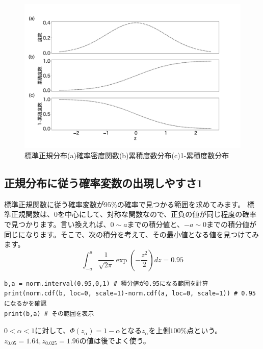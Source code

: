 \begin{figure}
    \begin{center}
        \includegraphics[width=15cm]{./image/02_/standard_normal.pdf}
        \caption{標準正規分布(a)確率密度関数(b)累積度数分布(c)1-累積度数分布}
        \label{fig:standard_normal_distribution}

    \end{center}
\end{figure}
    

\subsection{正規分布に従う確率変数の出現しやすさ1}
標準正規関数に従う確率変数が$95\%$の確率で見つかる範囲を求めてみます。
標準正規関数は、0を中心にして、対称な関数なので、正負の値が同じ程度の確率で見つかります。言い換えれば、$0\sim a$までの積分値と、$-a\sim 0$までの積分値が同じになります。そこで、次の積分を考えて、その最小値となる値を見つけてみます。
\begin{equation}
\int_{-a}^{a} \frac{1}{\sqrt{2\pi}}\exp(-\frac{z^2}{2}) dz = 0.95
\end{equation}

\begin{lstlisting}
b,a = norm.interval(0.95,0,1) # 積分値が0.95になる範囲を計算
print(norm.cdf(b, loc=0, scale=1)-norm.cdf(a, loc=0, scale=1)) # 0.95になるかを確認
print(b,a) # その範囲を表示
\end{lstlisting}


$0<\alpha<1$に対して、$\Phi(z_\alpha) = 1-\alpha$となる$z_\alpha$を上側$100\%$点という。
$z_{0.05}=1.64,z_{0.025}=1.96$の値は後でよく使う。

